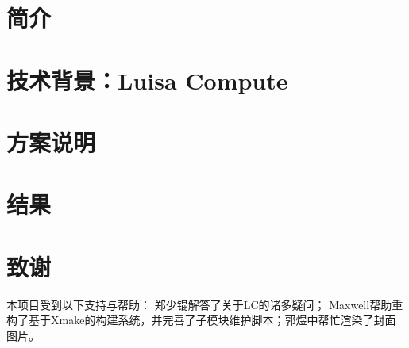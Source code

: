 \documentclass[
    coverpage = coverpage.tex,
    fontsetup = font-setup.tex,
    titlesetup = titles-setup.tex
]{si_template/cn_note}
\begin{document}
\frontmatter	%

\mainmatter

\chapter{简介}


\chapter{技术背景：Luisa Compute}


\chapter{方案说明}








\chapter{结果}


\chapter{致谢}
本项目受到以下支持与帮助： 郑少锟解答了关于LC的诸多疑问； Maxwell帮助重构了基于Xmake的构建系统，并完善了子模块维护脚本；郭煜中帮忙渲染了封面图片。



\backmatter
\end{document}
